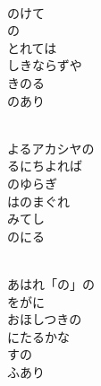 \documentclass[10pt,b5j]{tarticle} %
\begin{document}
\vspace{1.5em} %
\newcommand{\linespace}{0.5em} %
\newcommand{\blocksize}{0.5\hsize} %
\newcommand{\itemmargin}{6em} %
\begin{enumerate} %
    \setlength{\itemindent}{\itemmargin} %
    \begin{minipage}[c]{\blocksize}
    
        \vspace{\linespace}
        \item~\\
        のけて\\
        の\\
        とれては\\
        しきならずや\\
        きのる\\
        のあり
        
        \vspace{\linespace}
        \item~\\
        よるアカシヤの\\
        るにちよれば\\
        のゆらぎ\\
        はのまぐれ\\
        みてし\\
        のにる
        
        \vspace{\linespace}
        \item~\\
        あはれ「の」の\\
        をがに\\
        おほしつきの\\
        にたるかな\\
        すの\\
        ふあり
        

\end{minipage}
\end{enumerate}
\end{document}
